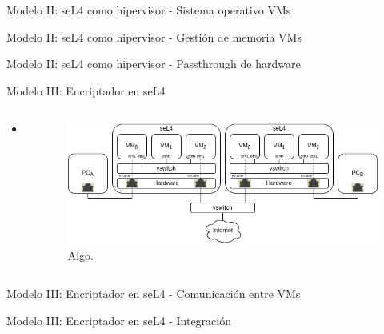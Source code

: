 \documentclass[serif, aspectratio=169]{beamer}
\begin{document}
\begin{frame}{Modelo II: seL4 como hipervisor - Sistema operativo VMs}
    
\end{frame}

\begin{frame}{Modelo II: seL4 como hipervisor - Gestión de memoria VMs}
    
\end{frame}

\begin{frame}{Modelo II: seL4 como hipervisor - Passthrough de hardware}
    
\end{frame}

\begin{frame}{Modelo III: Encriptador en seL4}
    \begin{columns}
        \begin{column}{0.4\textwidth}
            \begin{itemize}
                \item
            \end{itemize}
        \end{column}
        \begin{column}{0.6\textwidth}
            \begin{figure}
                \centering
                \includegraphics[width=\textwidth]{images/3_model4.png}
                \caption{Algo.}
            \end{figure}
        \end{column}
    \end{columns}
\end{frame}

\begin{frame}{Modelo III: Encriptador en seL4 - Comunicación entre VMs}

\end{frame}

\begin{frame}{Modelo III: Encriptador en seL4 - Integración}
\end{frame}
\end{document}
